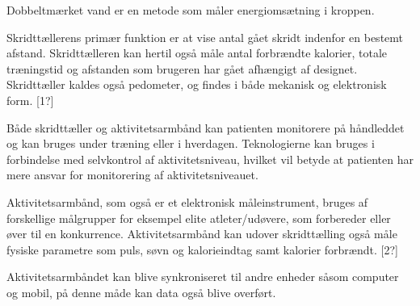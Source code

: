 Dobbeltmærket vand er en metode som måler energiomsætning i kroppen. 


Skridttællerens primær funktion er at vise antal gået skridt indenfor en bestemt afstand. 
Skridttælleren kan hertil også måle antal forbrændte kalorier, totale træningstid og afstanden som brugeren har gået afhængigt af  designet. Skridttæller kaldes også pedometer, og findes i både mekanisk og elektronisk form. [1?]

Både skridttæller og aktivitetsarmbånd kan patienten monitorere på håndleddet og kan bruges under træning eller i hverdagen. 
Teknologierne kan bruges i forbindelse med selvkontrol af aktivitetsniveau, hvilket vil betyde at patienten har mere ansvar for monitorering af aktivitetsniveauet. 

Aktivitetsarmbånd, som også er et elektronisk måleinstrument, bruges af forskellige målgrupper for eksempel elite atleter/udøvere, som forbereder eller øver til en konkurrence. 
Aktivitetsarmbånd kan udover skridttælling også måle fysiske parametre som puls, søvn og kalorieindtag samt kalorier forbrændt. [2?] 

Aktivitetsarmbåndet kan blive synkroniseret til andre enheder såsom computer og mobil, på denne måde kan data også blive overført. 







